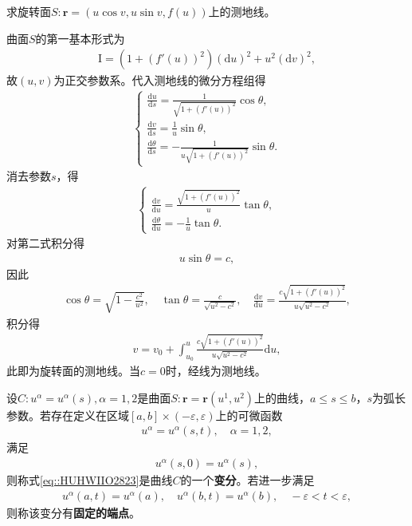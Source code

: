 \documentclass[../../main.tex]{subfiles}%
\begin{document}
\begin{example}
求旋转面$S:\boldsymbol{r}=(u\cos v,u\sin v,f(u))$上的测地线。
\end{example}

\begin{solution}

曲面$S$的第一基本形式为
\begin{align}
\mathrm{I}=(1+(f'(u))^2)(\mathrm{d}u)^2+u^2(\mathrm{d}v)^2,
\end{align}
故$(u,v)$为正交参数系。代入测地线的微分方程组得
\begin{align}
\begin{cases}
\frac{\mathrm{d}u}{\mathrm{d}s}=\frac{1}{\sqrt{1+(f'(u))^2}}\cos\theta,\\
\frac{\mathrm{d}v}{\mathrm{d}s}=\frac{1}{u}\sin\theta,\\
\frac{\mathrm{d}\theta}{\mathrm{d}s}=-\frac{1}{u\sqrt{1+(f'(u))^2}}\sin\theta.
\end{cases}
\end{align}
消去参数$s$，得
\begin{align}
\begin{cases}
\frac{\mathrm{d}v}{\mathrm{d}u}=\frac{\sqrt{1+(f'(u))^2}}{u}\tan\theta,\\
\frac{\mathrm{d}\theta}{\mathrm{d}u}=-\frac{1}{u}\tan\theta.
\end{cases}
\end{align}
对第二式积分得
\begin{align}
u\sin\theta=c,
\end{align}
因此
\begin{align*}
\cos\theta=\sqrt{1-\frac{c^2}{u^2}},\quad \tan\theta=\frac{c}{\sqrt{u^2-c^2}},\quad \frac{\mathrm{d}v}{\mathrm{d}u}=\frac{c\sqrt{1+(f'(u))^2}}{u\sqrt{u^2-c^2}},
\end{align*}
积分得
\begin{align}
v=v_0+\int_{u_0}^{u}\frac{c\sqrt{1+(f'(u))^2}}{u\sqrt{u^2-c^2}}\mathrm{d}u,
\end{align}
此即为旋转面的测地线。当$c=0$时，经线为测地线。

\end{solution}

\begin{definition}
设$C:u^\alpha=u^\alpha(s),\alpha=1,2$是曲面$S:\boldsymbol{r}=\boldsymbol{r}(u^1,u^2)$上的曲线，$a\leqslant s\leqslant b$，$s$为弧长参数。若存在定义在区域$[a,b]\times(-\varepsilon,\varepsilon)$上的可微函数
\begin{align}\label{eq::HUHWIIO2823}
u^\alpha=u^\alpha(s,t),\quad \alpha=1,2,
\end{align}
满足
\begin{align}
u^\alpha(s,0)=u^\alpha(s),
\end{align}
则称式\eqref{eq::HUHWIIO2823}是曲线$C$的一个\textbf{变分}。若进一步满足
\begin{align}
u^\alpha(a,t)=u^\alpha(a),\quad u^\alpha(b,t)=u^\alpha(b),\quad -\varepsilon<t<\varepsilon,
\end{align}
则称该变分有\textbf{固定的端点}。
\end{definition}
\end{document}
